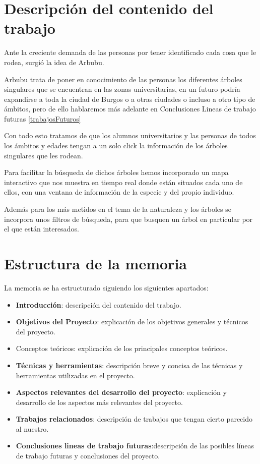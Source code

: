 
\section{Descripción del contenido del trabajo}
Ante la creciente demanda de las personas por tener identificado cada cosa que le rodea, surgió la idea de Arbubu.

Arbubu trata de poner en conocimiento de las personas los diferentes árboles singulares que se encuentran en las zonas universitarias, en un futuro podría expandirse a toda la ciudad de Burgos o a otras ciudades o incluso a otro tipo de ámbitos, pero de ello hablaremos más adelante en Conclusiones Lineas de trabajo futuras
\ref{trabajosFuturos} 

Con todo esto tratamos de que los alumnos universitarios y las personas de todos los ámbitos y edades tengan a un solo click la información de los árboles singulares que les rodean.

Para facilitar la búsqueda de dichos árboles hemos incorporado un mapa interactivo que nos muestra en tiempo real donde están situados cada uno de ellos, con una ventana de información de la especie y del propio individuo.

Además para los más metidos en el tema de la naturaleza y los árboles se incorpora unos filtros de búsqueda, para que busquen un árbol en particular por el que están interesados.
\newpage


\section{Estructura de la memoria}
La memoria se ha estructurado siguiendo los siguientes apartados:
\begin{itemize}
	\item \textbf{Introducción}: descripción del contenido del trabajo.
	\item \textbf{Objetivos del Proyecto}: explicación de los objetivos generales y técnicos del proyecto.
	\item Conceptos teóricos: explicación de los principales conceptos teóricos.
	\item \textbf{Técnicas y herramientas}: descripción breve y concisa de las técnicas y herramientas utilizadas en el proyecto.
	\item \textbf{Aspectos relevantes del desarrollo del proyecto}: explicación y desarrollo de los aspectos más relevantes del proyecto.
	\item \textbf{Trabajos relacionados}: descripción de trabajos que tengan cierto parecido al nuestro.
	\item \textbf{Conclusiones lineas de trabajo futuras}:descripción de las posibles líneas de trabajo futuras y conclusiones del proyecto.
\end{itemize}


